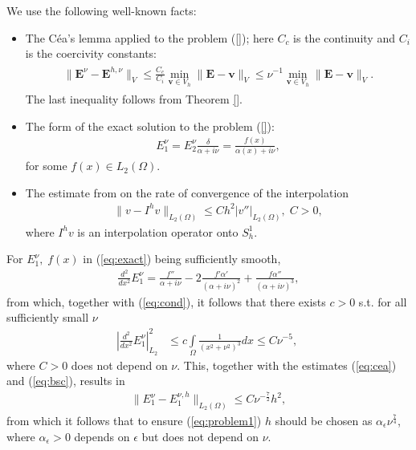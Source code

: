 \documentclass[proc]{edpsmath}
\begin{document}
We use the following well-known facts:
\begin{itemize}
 \item The C\'ea's lemma applied to the problem (\ref{}); here $C_c$ is the continuity and $C_i$ is the coercivity constants:
\begin{align}
\label{eq:cea}
\begin{split}
 \|\mathbf{E}^{\nu}-\mathbf{E}^{h,\nu}\|_{V}\leq \frac{C_c}{C_i}\min_{\mathbf{v}\in V_h}\|\mathbf{E}-\mathbf{v}\|_{V}
 \leq \nu^{-1}\min_{\mathbf{v}\in V_h}\|\mathbf{E}-\mathbf{v}\|_{V}.
 \end{split}
\end{align}
The last inequality follows from Theorem \ref{}.  
\item The form of the exact solution to the problem (\ref{}):
\begin{align}
\label{eq:exact}
 E_{1}^{\nu}=E_{2}^{\nu}\frac{\delta}{\alpha+i\nu}=\frac{f(x)}{\alpha(x)+i\nu},
\end{align}
for some $f(x)\in L_{2}(\Omega)$.
\item The estimate from \cite[Chapter 0]{Brenner_Scott} on the rate of convergence of the interpolation 
\begin{align}
\label{eq:bsc}
 \|v-I^{h}v\|_{L_{2}(\Omega)}\leq Ch^2|v''|_{L_{2}(\Omega)},\; C>0, %
\end{align}
where $I^{h}v$ is an interpolation operator onto $S_{h}^{1}$.
\end{itemize}
For $E_{1}^{\nu},\;f(x)$ in (\ref{eq:exact}) being sufficiently smooth, 
\begin{align*}
 \frac{d^2}{dx^2}E_{1}^{\nu}=\frac{f''}{\alpha+i\nu}-2\frac{f'\alpha'}{(\alpha+i\nu)^2}+\frac{f\alpha''}{(\alpha+i\nu)^3},
\end{align*}
from which, together with (\ref{eq:cond}), it follows that there exists $c>0$ s.t. for all sufficiently small $\nu$ 
\begin{align*}
 \left|  \frac{d^2}{dx^2}E_{1}^{\nu}\right|_{L_2}^{2}&\leq c\int\limits_{\Omega}\frac{1}{(x^2+\nu^2)^{3}}dx
 \leq C\nu^{-5},\; 
\end{align*}
where $C>0$ does not depend on $\nu$. This, together with the estimates (\ref{eq:cea}) and (\ref{eq:bsc}), results in 
\begin{align*}
 \|E^{\nu}_{1}-E^{\nu,h}_{1}\|_{L_{2}(\Omega)}\leq C\nu^{-\frac{7}{2}}h^2,
\end{align*}
from which it follows that to ensure (\ref{eq:problem1}) $h$ should be chosen as $\alpha_{\epsilon}\nu^{\frac{7}{4}}$, 
where $\alpha_{\epsilon}>0$ depends on $\epsilon$ but does not depend on $\nu$. 
\end{document}
